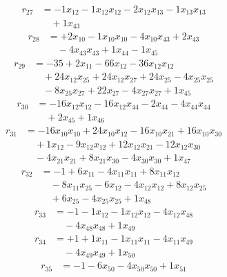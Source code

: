 \[\begin{aligned}
r_{27} &= - 1 x_{12} - 1 x_{12} x_{12} - 2 x_{12} x_{13} - 1 x_{13} x_{13} \\
 &\quad + 1 x_{43}
\end{aligned}\]
\[\begin{aligned}
r_{28} &= + 2 x_{10} - 1 x_{10} x_{10} - 4 x_{10} x_{43} + 2 x_{43} \\
 &\quad - 4 x_{43} x_{43} + 1 x_{44} - 1 x_{45}
\end{aligned}\]
\[\begin{aligned}
r_{29} &= - 35 + 2 x_{11} - 66 x_{12} - 36 x_{12} x_{12} \\
 &\quad + 24 x_{12} x_{25} + 24 x_{12} x_{27} + 24 x_{25} - 4 x_{25} x_{25} \\
 &\quad - 8 x_{25} x_{27} + 22 x_{27} - 4 x_{27} x_{27} + 1 x_{45}
\end{aligned}\]
\[\begin{aligned}
r_{30} &= - 16 x_{12} x_{12} - 16 x_{12} x_{44} - 2 x_{44} - 4 x_{44} x_{44} \\
 &\quad + 2 x_{45} + 1 x_{46}
\end{aligned}\]
\[\begin{aligned}
r_{31} &= - 16 x_{10} x_{10} + 24 x_{10} x_{12} - 16 x_{10} x_{21} + 16 x_{10} x_{30} \\
 &\quad + 1 x_{12} - 9 x_{12} x_{12} + 12 x_{12} x_{21} - 12 x_{12} x_{30} \\
 &\quad - 4 x_{21} x_{21} + 8 x_{21} x_{30} - 4 x_{30} x_{30} + 1 x_{47}
\end{aligned}\]
\[\begin{aligned}
r_{32} &= - 1 + 6 x_{11} - 4 x_{11} x_{11} + 8 x_{11} x_{12} \\
 &\quad - 8 x_{11} x_{25} - 6 x_{12} - 4 x_{12} x_{12} + 8 x_{12} x_{25} \\
 &\quad + 6 x_{25} - 4 x_{25} x_{25} + 1 x_{48}
\end{aligned}\]
\[\begin{aligned}
r_{33} &= - 1 - 1 x_{12} - 1 x_{12} x_{12} - 4 x_{12} x_{48} \\
 &\quad - 4 x_{48} x_{48} + 1 x_{49}
\end{aligned}\]
\[\begin{aligned}
r_{34} &= + 1 + 1 x_{11} - 1 x_{11} x_{11} - 4 x_{11} x_{49} \\
 &\quad - 4 x_{49} x_{49} + 1 x_{50}
\end{aligned}\]
\[\begin{aligned}
r_{35} &= - 1 - 6 x_{50} - 4 x_{50} x_{50} + 1 x_{51}
\end{aligned}\]
